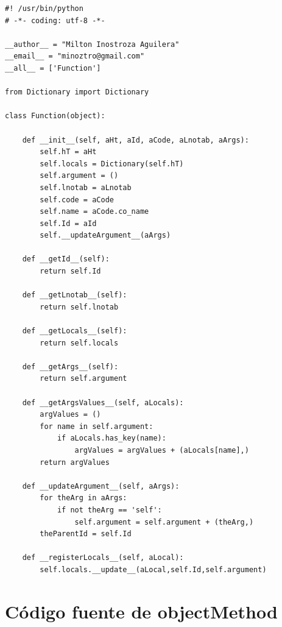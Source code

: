 \documentclass[12pt,legalpaper]{report}
\begin{document}
\begin{singlespace}
\begin{lstlisting}[style=Python]
#! /usr/bin/python
# -*- coding: utf-8 -*-

__author__ = "Milton Inostroza Aguilera"
__email__ = "minoztro@gmail.com"
__all__ = ['Function']

from Dictionary import Dictionary

class Function(object):

    def __init__(self, aHt, aId, aCode, aLnotab, aArgs):
        self.hT = aHt
        self.locals = Dictionary(self.hT)
        self.argument = ()
        self.lnotab = aLnotab
        self.code = aCode
        self.name = aCode.co_name
        self.Id = aId
        self.__updateArgument__(aArgs)

    def __getId__(self):
        return self.Id

    def __getLnotab__(self):
        return self.lnotab

    def __getLocals__(self):
        return self.locals

    def __getArgs__(self):
        return self.argument
    
    def __getArgsValues__(self, aLocals):
        argValues = ()
        for name in self.argument:
            if aLocals.has_key(name):
                argValues = argValues + (aLocals[name],)
        return argValues

    def __updateArgument__(self, aArgs):
        for theArg in aArgs:
            if not theArg == 'self':
                self.argument = self.argument + (theArg,)
        theParentId = self.Id            
            
    def __registerLocals__(self, aLocal):
        self.locals.__update__(aLocal,self.Id,self.argument)
\end{lstlisting}
\end{singlespace}

	\section{Código fuente de objectMethod}
	
\end{document}
